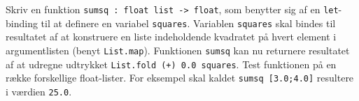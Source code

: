 Skriv en funktion \lstinline{sumsq : float list -> float}, som
benytter sig af en \lstinline{let}-binding til at definere en variabel
\lstinline{squares}. Variablen \lstinline{squares} skal bindes til
resultatet af at konstruere en liste indeholdende kvadratet på hvert
element i argumentlisten (benyt \lstinline{List.map}). Funktionen
\lstinline{sumsq} kan nu returnere resultatet af at udregne udtrykket
\lstinline{List.fold (+) 0.0 squares}.
%
Test funktionen på en række forskellige float-lister. For eksempel
skal kaldet \lstinline{sumsq [3.0;4.0]} resultere i
værdien \lstinline{25.0}.
